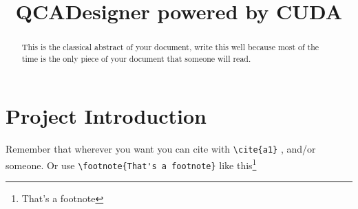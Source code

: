 \documentclass[a4paper,12pt]{article}
\begin{document}
\title{QCADesigner powered by CUDA}

\providecommand{\primoautore}{Gibilisco~\sc{Giovanni Paolo}}               
\providecommand{\primamatricola}{755066}            
\providecommand{\secondoautore}{Marconi~\sc{Francesco}}
\providecommand{\secondamatricola}{755439}
\providecommand{\terzoautore}{Miglierina~\sc{Marco}}
\providecommand{\terzamatricola}{754848}
\providecommand{\instructor}{Prof.ssa Sciuto~\sc{Donatella}}  
\providecommand{\tutor}{Santambrogio~\sc{Marco Domenico}}
\providecommand{\annoacc}{2009-2010}

\titlfp


\newpage

\tableofcontents

\newpage

\listoffigures



\headsep 2cm
\hoffset -1cm
\textwidth 15cm
\setlength{\headwidth}{\textwidth}


\newpage

\begin{abstract}
This is the classical abstract of your document, write this well because most of the time is the only piece of your document that someone will read.
\end{abstract}


\newpage

\section{Project Introduction}\label{sec:i}
Remember that wherever you want you can cite with \verb.\cite{a1}. \cite{a1}, \cite{b1} and/or \cite{m1} someone.
Or use \verb.\footnote{That's a footnote}. like this\footnote{That's a footnote} 
\end{document}
